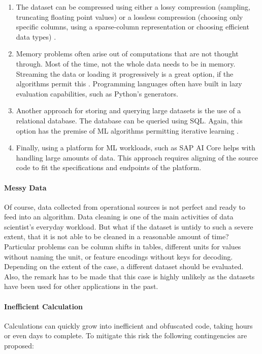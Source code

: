 \begin{enumerate}
	\item The dataset can be compressed using either a lossy compression (sampling, truncating floating point values) or a lossless compression (choosing only specific columns, using a sparse-column representation or choosing efficient data types) \cite{largeDataSetMedium}.
	\item Memory problems often arise out of computations that are not thought through. Most of the time, not the whole data needs to be in memory. Streaming the data or loading it progressively is a great option, if the algorithms permit this \cite{largeDataSetBrownlee}. Programming languages often have built in lazy evaluation capabilities, such as Python's generators.
	\item Another approach for storing and querying large datasets is the use of a relational database. The database can be queried using \ac{SQL}. Again, this option has the premise of \ac{ML} algorithms permitting iterative learning \cite{largeDataSetBrownlee}. 
	\item Finally, using a platform for \ac{ML} workloads, such as SAP AI Core helps with handling large amounts of data. This approach requires aligning of the source code to fit the specifications and endpoints of the platform.
\end{enumerate}

\paragraph{Messy Data} Of course, data collected from operational sources is not perfect and ready to feed into an algorithm. Data cleaning is one of the main activities of data scientist's everyday workload. But what if the dataset is untidy to such a severe extent, that it is not able to be cleaned in a reasonable amount of time?
Particular problems can be column shifts in tables, different units for values without naming the unit, or feature encodings without keys for decoding.
Depending on the extent of the case, a different dataset should be evaluated. Also, the remark has to be made that this case is highly unlikely as the datasets have been used for other applications in the past.

\paragraph{Inefficient Calculation} Calculations can quickly grow into inefficient and obfuscated code, taking hours or even days to complete. To mitigate this risk the following contingencies are proposed:

